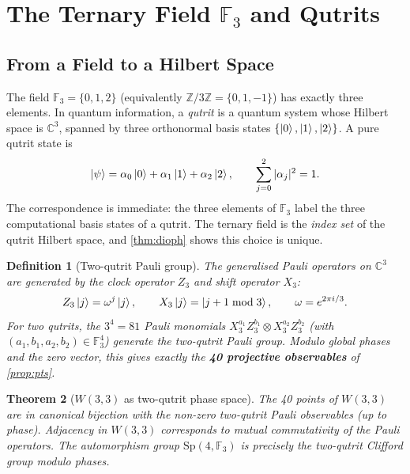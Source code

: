 ﻿\documentclass[12pt]{article}
\newtheorem{theorem}{Theorem}[section]
\newtheorem{definition}[theorem]{Definition}
\newcommand{\FF}{\mathbb{F}}
\newcommand{\CC}{\mathbb{C}}
\newcommand{\ZZ}{\mathbb{Z}}
\newcommand{\Sp}{\mathrm{Sp}}
\newcommand{\GF}[1]{\mathbb{F}_{#1}}
\begin{document}
\section{The Ternary Field \texorpdfstring{$\GF{3}$}{F3} and Qutrits}
\label{sec:qutrits}

\subsection{From a Field to a Hilbert Space}

The field $\GF{3} = \{0, 1, 2\}$ (equivalently $\ZZ/3\ZZ = \{0, 1, -1\}$) has
exactly three elements.  In quantum information, a \emph{qutrit} is a quantum system
whose Hilbert space is $\CC^3$, spanned by three orthonormal basis states
$\{\ket{0},\ket{1},\ket{2}\}$.  A pure qutrit state is
\begin{equation}
  \ket{\psi} = \alpha_0\ket{0} + \alpha_1\ket{1} + \alpha_2\ket{2}, \qquad
  \sum_{j=0}^{2}|\alpha_j|^2 = 1.
\end{equation}
The correspondence is immediate: the three elements of $\GF{3}$ label the three
computational basis states of a qutrit.  The ternary field is the \emph{index set}
of the qutrit Hilbert space, and \cref{thm:dioph} shows this choice is unique.

\begin{definition}[Two-qutrit Pauli group]\label{def:pauli3}
The generalised Pauli operators on $\CC^3$ are generated by the clock operator $Z_3$
and shift operator $X_3$:
\begin{equation}
  Z_3\ket{j} = \omega^j\ket{j}, \qquad X_3\ket{j} = \ket{j+1 \bmod 3},
  \qquad \omega = e^{2\pi i/3}.
\end{equation}
For two qutrits, the $3^4 = 81$ Pauli monomials
$X_3^{a_1}Z_3^{b_1} \otimes X_3^{a_2}Z_3^{b_2}$ (with $(a_1,b_1,a_2,b_2)\in\GF{3}^4$)
generate the two-qutrit Pauli group.  Modulo global phases and the zero vector, this
gives exactly the \textbf{40 projective observables} of \cref{prop:pts}.
\end{definition}

\begin{theorem}[$W(3,3)$ as two-qutrit phase space]\label{thm:phasespace}
The 40 points of $W(3,3)$ are in canonical bijection with the non-zero two-qutrit
Pauli observables (up to phase).  Adjacency in $W(3,3)$ corresponds to mutual
\emph{commutativity} of the Pauli operators.  The automorphism group $\Sp(4,\FF_3)$
is precisely the two-qutrit Clifford group modulo phases.
\end{theorem}
\end{document}
